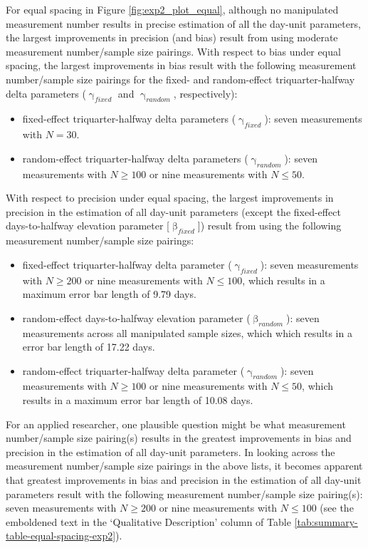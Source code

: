 \documentclass[
12pt, %
twoside,
english]{guelphthesis}
\begin{document}
For equal spacing in Figure \ref{fig:exp2_plot_equal}, although no manipulated measurement number results in precise estimation of all the day-unit parameters, the largest improvements in precision (and bias) result from using moderate measurement number/sample size pairings. With respect to bias under equal spacing, the largest improvements in bias result with the following measurement number/sample size pairings for the fixed- and random-effect triquarter-halfway delta parameters (\(\upgamma_{fixed}\) and \(\upgamma_{random}\), respectively):
\begin{itemize}
\tightlist
\item
  fixed-effect triquarter-halfway delta parameters (\(\upgamma_{fixed}\)): seven measurements with \(N = 30\).
\item
  random-effect triquarter-halfway delta parameters (\(\upgamma_{random}\)): seven measurements with \(N \ge 100\) or nine measurements with \(N \le 50\).
\end{itemize}
\noindent With respect to precision under equal spacing, the largest improvements in precision in the estimation of all day-unit parameters (except the fixed-effect days-to-halfway elevation parameter {[}\(\upbeta_{fixed}\){]}) result from using the following measurement number/sample size pairings:
\begin{itemize}
\tightlist
\item
  fixed-effect triquarter-halfway delta parameter (\(\upgamma_{fixed}\)): seven measurements with \(N \ge 200\) or nine measurements with \(N \le 100\), which results in a maximum error bar length of 9.79 days.
\item
  random-effect days-to-halfway elevation parameter (\(\upbeta_{random}\)): seven measurements across all manipulated sample sizes, which which results in a error bar length of 17.22 days.
\item
  random-effect triquarter-halfway delta parameter (\(\upgamma_{random}\)): seven measurements with \(N \ge 100\) or nine measurements with \(N \le 50\), which results in a maximum error bar length of 10.08 days.
\end{itemize}
For an applied researcher, one plausible question might be what measurement number/sample size pairing(s) results in the greatest improvements in bias and precision in the estimation of all day-unit parameters. In looking across the measurement number/sample size pairings in the above lists, it becomes apparent that greatest improvements in bias and precision in the estimation of all day-unit parameters result with the following measurement number/sample size pairing(s): seven measurements with \(N \ge 200\) or nine measurements with \(N \le 100\) (see the emboldened text in the `Qualitative Description' column of Table \ref{tab:summary-table-equal-spacing-exp2}).
\end{document}
